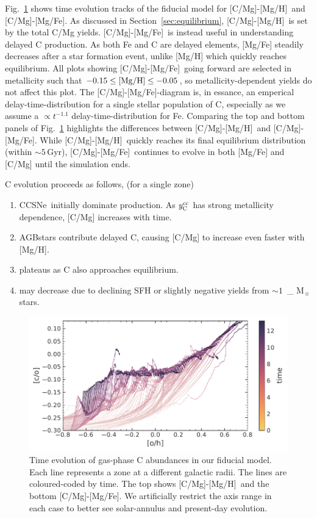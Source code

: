 \documentclass[fleqn,usenatbib]{mnras}
\newcommand{\agb}{AGB}
\newcommand{\cc}{CCSNe}
\newcommand{\caah}{[C/Mg]-[Mg/H]}
\newcommand{\caafe}{[C/Mg]-[Mg/Fe]}
\newcommand{\Ycc}{\ensuremath{y_{\rm C}^{\rm cc}}}
\newcommand{\Mo}{%
    \ifmmode {\rm M}_{\sun}%
    \else M$_{\sun}$
    \fi}
\newcommand{\about}[1]{${\sim} #1$}
\begin{document}
Fig.~\ref{fig:c_evo} shows time evolution tracks of the fiducial model for \caah\ and \caafe. 
As discussed in Section~\ref{sec:equilibrium}, \caah\ is set by the total C/Mg yields. 
\caafe\ is instead useful in understanding delayed C production. 
As both Fe and C are delayed elements, [Mg/Fe] steadily decreases after a star formation event, unlike [Mg/H] which quickly reaches equilibrium.  All plots showing \caafe\ going forward are selected in metallicity such that $-0.15 \leq {\rm [Mg/H]} \leq -0.05$, so metallicity-dependent yields do not affect this plot. 
The \caafe{}-diagram is, in essance, an emperical delay-time-distribution for a single stellar population of C, especially as we assume a $\propto t^{-1.1}$ delay-time-distribution for Fe. 
Comparing the top and bottom panels of Fig.~\ref{fig:c_evo} highlights the differences between \caah\ and \caafe. While \caah\ quickly reaches its final equilibrium distribution (within \about{5}\,Gyr), \caafe\ continues to evolve in both [Mg/Fe] and [C/Mg] until the simulation ends.

C evolution proceeds as follows, (for a single zone)
\begin{enumerate}
    \item \cc\ initially dominate production. As $\Ycc$ has strong metallicity dependence, [C/Mg] increases with time. 
    \item \agb stars contribute delayed C, causing [C/Mg] to increase even faster with [Mg/H]. 
    \item[(iii)] [C/Mg] plateaus as C also approaches equilibrium. 
    \item[(iv)] [C/Mg] may decrease due to declining SFH or slightly negative yields from \about{1}\,\Mo stars.

\end{enumerate}


\begin{figure}
\centering
\includegraphics{all_the_tracks.pdf}
\caption[Carbon Chemical Evolution Tracks]{
    Time evolution of gas-phase C abundances in our fiducial model.
    Each line represents a zone at a different galactic radii. The lines are coloured-coded by time. The top shows \caah\ and the bottom \caafe. We artificially restrict the axis range in each case to better see solar-annulus and present-day evolution.
}
\label{fig:c_evo}
\end{figure}
\end{document}
